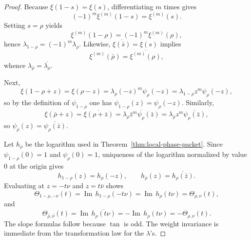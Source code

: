 \documentclass[11pt]{amsart}
\numberwithin{equation}{section}
\theoremstyle{definition}
\theoremstyle{remark}
\DeclareMathOperator{\Ima}{Im}
\begin{document}
\begin{proof}
Because $\xi(1-s)=\xi(s)$, differentiating $m$ times gives
\[
(-1)^m\xi^{(m)}(1-s)=\xi^{(m)}(s).
\]
Setting $s=\rho$ yields
\[
\xi^{(m)}(1-\rho)=(-1)^m\xi^{(m)}(\rho),
\]
hence $\lambda_{1-\rho}=(-1)^m\lambda_\rho$.  Likewise, $\overline{\xi(\bar s)}=\xi(s)$ implies
\[
\xi^{(m)}(\bar\rho)=\overline{\xi^{(m)}(\rho)},
\]
whence $\lambda_{\bar\rho}=\overline{\lambda_\rho}$.

Next,
\[
\xi(1-\rho+z)=\xi(\rho-z)=\lambda_\rho(-z)^m\psi_\rho(-z)=\lambda_{1-\rho} z^m\psi_\rho(-z),
\]
so by the definition of $\psi_{1-\rho}$ one has $\psi_{1-\rho}(z)=\psi_\rho(-z)$.  Similarly,
\[
\xi(\bar\rho+z)=\overline{\xi(\rho+\bar z)}
=\overline{\lambda_\rho \bar z^m \psi_\rho(\bar z)}
=\lambda_{\bar\rho} z^m\overline{\psi_\rho(\bar z)},
\]
so $\psi_{\bar\rho}(z)=\overline{\psi_\rho(\bar z)}$.

Let $h_\rho$ be the logarithm used in Theorem~\ref{thm:local-phase-packet}.  Since $\psi_{1-\rho}(0)=1$ and $\psi_\rho(0)=1$, uniqueness of the logarithm normalized by value $0$ at the origin gives
\[
h_{1-\rho}(z)=h_\rho(-z),
\qquad
h_{\bar\rho}(z)=\overline{h_\rho(\bar z)}.
\]
Evaluating at $z=-t\nu$ and $z=t\bar\nu$ shows
\[
\Theta_{1-\rho,-\nu}(t)=\Ima\,h_{1-\rho}(-t\nu)=\Ima\,h_\rho(t\nu)=\Theta_{\rho,\nu}(t),
\]
and
\[
\Theta_{\bar\rho,\bar\nu}(t)=\Ima\,\overline{h_\rho(t\nu)}=-\Ima\,h_\rho(t\nu)=-\Theta_{\rho,\nu}(t).
\]
The slope formulas follow because $\tan$ is odd.  The weight invariance is immediate from the transformation law for the $\lambda$'s.
\end{proof}
\end{document}
